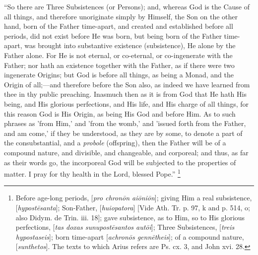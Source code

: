 ``So there are Three Subsistences (or Persons); and, whereas
God is the Cause of all things, and therefore unoriginate simply by
Himself, the Son on the other hand, born of the Father time-apart, and
created and established before all periods, did not exist before He
was born, but being born of the Father time-apart, was brought into
substantive existence (subsistence), He alone by the Father alone. For
He is not eternal, or co-eternal, or co-ingenerate with the Father;
nor hath an existence together with the Father, as if there were two
ingenerate Origins; but God is before all things, as being a Monad,
and the Origin of all;—and therefore before the Son also, as indeed
we have learned from thee in thy public preaching. Inasmuch then
as it is from God that He hath His being, and His glorious
perfections, and His life, and His charge of all things, for this
reason God is His Origin, as being His God and before Him. As to such
phrases as 'from Him,' and 'from the womb,' and 'issued forth from the
Father, and am come,' if they be understood, as they are by some, to
denote a part of the consubstantial, and a \emph{probole} (offspring),
then the Father will be of a compound nature, and divisible, and
changeable, and corporeal; and thus, as far as their words go, the
incorporeal God will be subjected to the properties of matter. I pray
for thy health in the Lord, blessed Pope.'' \footnote{Before age-long periods, [\emph{pro chron\={o}n
ai\={o}ni\={o}n}]; giving Him a real subsistence, [\emph{hypost\={e}santa}];
Son-Father, [\emph{huiopatora}] [Vide Ath. Tr. p. 97, k and p. 514, o;
also Didym. de Trin. iii. 18]; gave subsistence, as to Him, so to His
glorious perfections, [\emph{tas doxas sunupost\={e}santos aut\={o}i}];
Three Subsistences, [\emph{treis hypostaseis}]; born time-apart [\emph{achron\={o}s
genn\={e}theis}]; of a compound nature, [\emph{sunthetos}]. The texts
to which Arius refers are Ps. cx. 3, and John xvi. 28.}

